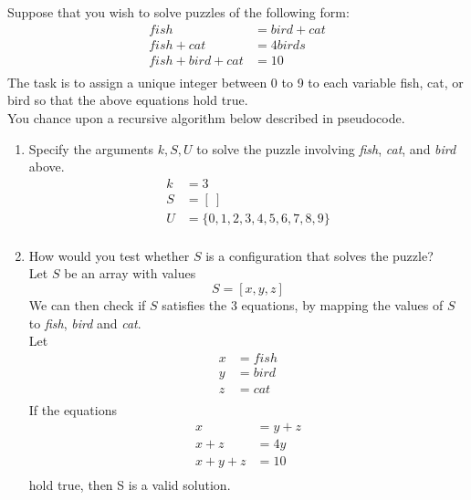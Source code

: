 \item Suppose that you wish to solve puzzles of the following form:
\begin{align*}
    fish              & = bird + cat \\
    fish + cat        & = 4 birds    \\
    fish + bird + cat & = 10         \\
\end{align*}
The task is to assign a unique integer between 0 to 9 to each variable fish, cat, or bird so that the above equations hold true. \\
You chance upon a recursive algorithm below described in pseudocode.
\begin{center}
\end{center}
\begin{enumerate}

    \item Specify the arguments $k, S, U$ to solve the puzzle involving \emph{fish}, \emph{cat}, and \emph{bird} above.
          \begin{align*}
              k & =3                       \\
              S & =[\ ]                    \\
              U & =\{0,1,2,3,4,5,6,7,8,9\} \\
          \end{align*}
          \clearpage
    \item How would you test whether $S$ is a configuration that solves the puzzle?
          \\Let $S$ be an array with values
          \begin{equation*}
              S=[x,y,z]
          \end{equation*}
          We can then check if $S$ satisfies the 3 equations, by mapping the values of $S$ to \emph{fish}, \emph{bird} and \emph{cat}.\\
          Let
          \begin{align*}
              x & =fish \\
              y & =bird \\
              z & =cat  \\
          \end{align*}
          If the equations
          \begin{align*}
              x         & = y + z \\
              x + z     & = 4y    \\
              x + y + z & = 10    \\
          \end{align*}
          hold true, then S is a valid solution.


\end{enumerate}
